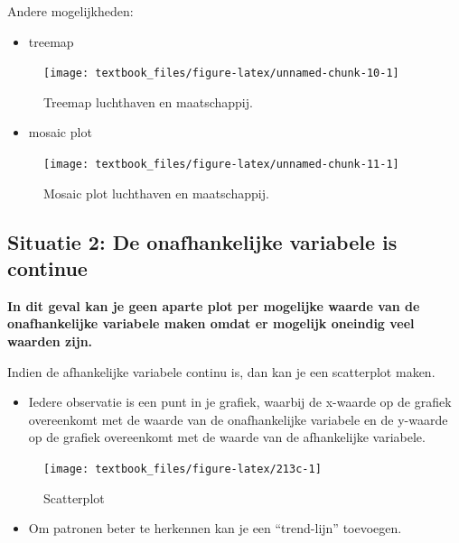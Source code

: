 \documentclass[]{tufte-book}
\providecommand{\tightlist}{%
  \setlength{\itemsep}{0pt}\setlength{\parskip}{0pt}}
\begin{document}
Andere mogelijkheden:

\begin{itemize}
\tightlist
\item
  treemap
\end{itemize}

\begin{figure}
\texttt{[image: textbook\_files/figure-latex/unnamed-chunk-10-1]} \caption[Treemap luchthaven en maatschappij]{Treemap luchthaven en maatschappij.}\label{fig:unnamed-chunk-10}
\end{figure}

\begin{itemize}
\tightlist
\item
  mosaic plot
\end{itemize}

\begin{figure}
\texttt{[image: textbook\_files/figure-latex/unnamed-chunk-11-1]} \caption[Mosaic plot luchthaven en maatschappij]{Mosaic plot luchthaven en maatschappij.}\label{fig:unnamed-chunk-11}
\end{figure}

\hypertarget{situatie-2-de-onafhankelijke-variabele-is-continue}{%
\subsection{Situatie 2: De onafhankelijke variabele is continue}\label{situatie-2-de-onafhankelijke-variabele-is-continue}}

\textbf{In dit geval kan je geen aparte plot per mogelijke waarde van de onafhankelijke variabele maken omdat er mogelijk oneindig veel waarden zijn.}

Indien de afhankelijke variabele continu is, dan kan je een scatterplot maken.

\begin{itemize}
\tightlist
\item
  Iedere observatie is een punt in je grafiek, waarbij de x-waarde op de grafiek overeenkomt met de waarde van de onafhankelijke variabele en de y-waarde op de grafiek overeenkomt met de waarde van de afhankelijke variabele.
\end{itemize}

\begin{figure}
\texttt{[image: textbook\_files/figure-latex/213c-1]} \caption[Scatterplot]{Scatterplot}\label{fig:213c}
\end{figure}

\begin{itemize}
\tightlist
\item
  Om patronen beter te herkennen kan je een ``trend-lijn'' toevoegen.
\end{itemize}
\end{document}
